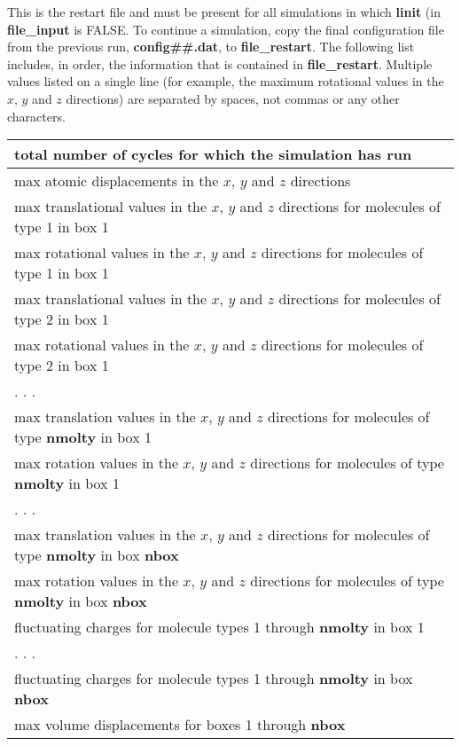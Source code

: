 \documentclass[12pt,letterpaper]{article}
\begin{document}
 This is the restart file and
must be present for all simulations in which {\bf linit} (in
{\bf file\_input} is FALSE. To continue a simulation, copy
the final configuration file from the previous run, {\bf
  config\#\#.dat}, to {\bf file\_restart}. The following
list includes, in order, the information that is contained
in {\bf file\_restart}. Multiple values listed on a single
line (for example, the maximum rotational values in the $x$,
$y$ and $z$ directions) are separated by spaces, not commas
or any other characters.
\begin{center}
\begin{tabular}{| l |}
\hline
total number of cycles for which the simulation has run \\ \hline
max atomic displacements in the $x$, $y$ and $z$ directions  \\ \hline
max translational values in the $x$, $y$ and $z$ directions for molecules of type 1 in box 1 \\ \hline
max rotational values in the $x$, $y$ and $z$ directions for molecules of type 1 in box 1 \\ \hline
max translational values in the $x$, $y$ and $z$ directions for molecules of type 2 in box 1 \\ \hline
max rotational values in the $x$, $y$ and $z$ directions for molecules of type 2 in box 1 \\ \hline
  . . . \\ \hline
max translation values in the $x$, $y$ and $z$ directions for molecules of type {\bf nmolty} in box 1 \\ \hline
max rotation values in the $x$, $y$ and $z$ directions for molecules of type {\bf nmolty} in box 1 \\ \hline
  . . . \\ \hline
max translation values in the $x$, $y$ and $z$ directions for molecules of type {\bf nmolty} in box {\bf nbox} \\ \hline
max rotation values in the $x$, $y$ and $z$ directions for molecules of type {\bf nmolty} in box {\bf nbox} \\ \hline
fluctuating charges for molecule types 1 through {\bf nmolty} in box 1 \\ \hline
  . . . \\ \hline
fluctuating charges for molecule types 1 through {\bf nmolty} in box {\bf nbox} \\ \hline
max volume displacements for boxes 1 through {\bf nbox} \\ \hline

\end{tabular}
\end{center}
\end{document}
